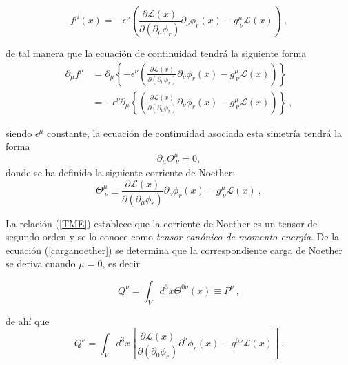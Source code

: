 \begin{equation}
f^{\mu }(x)=-\epsilon ^{\nu }\left( \frac{\partial \mathcal{L}\left(x\right) }{\partial \left( \partial _{\mu }\phi _{r}\right) }\partial _{\nu}\phi _{r}\left( x\right) -g_{~\nu }^{\mu }\mathcal{L}\left( x\right)\right) ~,
\end{equation}

\noindent
de tal manera que la ecuación de continuidad tendrá la siguiente forma
\begin{equation}
    \begin{split}
        \partial_{\mu}f^{\mu}&=\partial_{\mu} \left\{ -\epsilon ^{\nu }\left( \frac{\partial \mathcal{L}\left(x\right) }{\partial \left( \partial _{\mu }\phi _{r}\right) }\partial _{\nu}\phi _{r}\left( x\right) -g_{~\nu }^{\mu }\mathcal{L}\left( x\right)\right) \right\} \\
        &=-\epsilon ^{\nu } \partial_{\mu} \left\{ \left( \frac{\partial \mathcal{L}\left(x\right) }{\partial \left( \partial _{\mu }\phi _{r}\right) }\partial _{\nu}\phi _{r}\left( x\right) -g_{~\nu }^{\mu }\mathcal{L}\left( x\right)\right) \right\}~,
    \end{split}
\end{equation}

\noindent
siendo $\epsilon^{\mu}$ constante, la ecuación de continuidad asociada esta simetría tendrá la forma
\begin{equation}
    \partial_{\mu} \Theta^{\mu}_{~\nu}=0,
    \label{derThe}
\end{equation}
donde se ha definido la siguiente corriente de Noether:
\begin{equation}
\boxed{
    \Theta^{\mu}_{~\nu}\equiv  \frac{\partial \mathcal{L}\left(x\right) }{\partial \left( \partial _{\mu }\phi _{r}\right) }\partial _{\nu}\phi _{r}\left( x\right) -g_{~\nu }^{\mu }\mathcal{L}\left( x\right)~,
    \label{TME}
    }
\end{equation}

\noindent
La relación (\ref{TME}) establece que la corriente de Noether es un tensor de segundo orden y se lo conoce como \emph{tensor canónico de momento-energía}. De la ecuación (\ref{carganoether}) se determina que la correspondiente carga de Noether se deriva cuando $\mu=0$, es decir

\begin{equation}
    Q^{\nu}=\int_{V} d^{3}x \Theta^{0 \nu}(x) \equiv P^{\nu}~,
    \label{eq_2.109}
\end{equation}

\noindent    
de ahí que
\begin{equation}
        Q^{\nu}= \int_{V} d^{3}x \left[ \frac{\partial \mathcal{L}\left(x\right) }{\partial \left( \partial _{0 }\phi _{r}\right) }\partial ^{\nu}\phi _{r}\left( x\right) -g^{0 \nu }\mathcal{L}\left( x\right) \right]~.
\end{equation}

